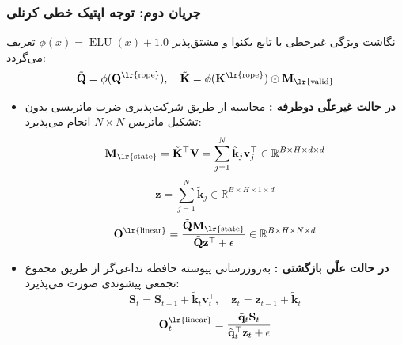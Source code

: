 \subsubsection*{جریان دوم: توجه اپتیک خطی کرنلی }
نگاشت ویژگی غیرخطی با تابع یکنوا و مشتق‌پذیر $\phi(x) = \operatorname{ELU}(x) + 1.0$ تعریف می‌گردد:
\begin{equation}
    \tilde{\mathbf{Q}} = \phi(\mathbf{Q}^{\text{\lr{rope}}}), \quad \tilde{\mathbf{K}} = \phi(\mathbf{K}^{\text{\lr{rope}}}) \odot \mathbf{M}_{\text{\lr{valid}}}
\end{equation}
\begin{itemize}
    \item \textbf{در حالت غیرعلّی دوطرفه :}
    محاسبه از طریق شرکت‌پذیری ضرب ماتریسی بدون تشکیل ماتریس $N \times N$ انجام می‌پذیرد:
    \begin{equation}
        \mathbf{M}_{\text{\lr{state}}} = \tilde{\mathbf{K}}^\top \mathbf{V} = \sum_{j=1}^N \tilde{\mathbf{k}}_j \mathbf{v}_j^\top \in \mathbb{R}^{B \times H \times d \times d}
    \end{equation}
    \begin{equation}
        \mathbf{z} = \sum_{j=1}^N \tilde{\mathbf{k}}_j \in \mathbb{R}^{B \times H \times 1 \times d}
    \end{equation}
    \begin{equation}
        \mathbf{O}^{\text{\lr{linear}}} = \frac{\tilde{\mathbf{Q}} \mathbf{M}_{\text{\lr{state}}}}{\tilde{\mathbf{Q}} \mathbf{z}^\top + \epsilon} \in \mathbb{R}^{B \times H \times N \times d}
    \end{equation}
    \item \textbf{در حالت علّی بازگشتی :}
    به‌روزرسانی پیوسته حافظه تداعی‌گر از طریق مجموع تجمعی پیشوندی  صورت می‌پذیرد:
    \begin{equation}
        \mathbf{S}_t = \mathbf{S}_{t-1} + \tilde{\mathbf{k}}_t \mathbf{v}_t^\top, \quad \mathbf{z}_t = \mathbf{z}_{t-1} + \tilde{\mathbf{k}}_t
    \end{equation}
    \begin{equation}
        \mathbf{O}_t^{\text{\lr{linear}}} = \frac{\tilde{\mathbf{q}}_t \mathbf{S}_t}{\tilde{\mathbf{q}}_t^\top \mathbf{z}_t + \epsilon}
    \end{equation}
\end{itemize}


